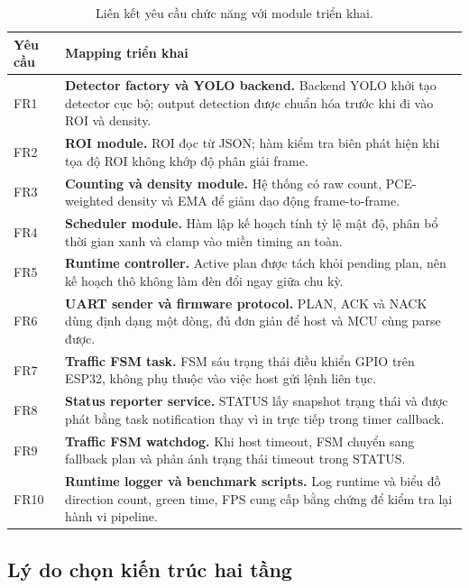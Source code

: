 \begin{table}[H]
\centering
\caption{Liên kết yêu cầu chức năng với module triển khai.}
\label{tab:req-to-module}
\footnotesize
\setlength{\tabcolsep}{4pt}
\renewcommand{\arraystretch}{1.16}
\begin{tabularx}{\linewidth}{C{1.2cm}Y}
\toprule
\textbf{Yêu cầu} & \textbf{Mapping triển khai} \\
\midrule
FR1 & \textbf{Detector factory và YOLO backend.} Backend YOLO khởi tạo detector cục bộ; output detection được chuẩn hóa trước khi đi vào ROI và density. \\
FR2 & \textbf{ROI module.} ROI đọc từ JSON; hàm kiểm tra biên phát hiện khi tọa độ ROI không khớp độ phân giải frame. \\
FR3 & \textbf{Counting và density module.} Hệ thống có raw count, PCE-weighted density và EMA để giảm dao động frame-to-frame. \\
FR4 & \textbf{Scheduler module.} Hàm lập kế hoạch tính tỷ lệ mật độ, phân bổ thời gian xanh và clamp vào miền timing an toàn. \\
FR5 & \textbf{Runtime controller.} Active plan được tách khỏi pending plan, nên kế hoạch thô không làm đèn đổi ngay giữa chu kỳ. \\
FR6 & \textbf{UART sender và firmware protocol.} PLAN, ACK và NACK dùng định dạng một dòng, đủ đơn giản để host và MCU cùng parse được. \\
FR7 & \textbf{Traffic FSM task.} FSM sáu trạng thái điều khiển GPIO trên ESP32, không phụ thuộc vào việc host gửi lệnh liên tục. \\
FR8 & \textbf{Status reporter service.} STATUS lấy snapshot trạng thái và được phát bằng task notification thay vì in trực tiếp trong timer callback. \\
FR9 & \textbf{Traffic FSM watchdog.} Khi host timeout, FSM chuyển sang fallback plan và phản ánh trạng thái timeout trong STATUS. \\
FR10 & \textbf{Runtime logger và benchmark scripts.} Log runtime và biểu đồ direction count, green time, FPS cung cấp bằng chứng để kiểm tra lại hành vi pipeline. \\
\bottomrule
\end{tabularx}
\normalsize
\end{table}

\subsection{Lý do chọn kiến trúc hai tầng}

